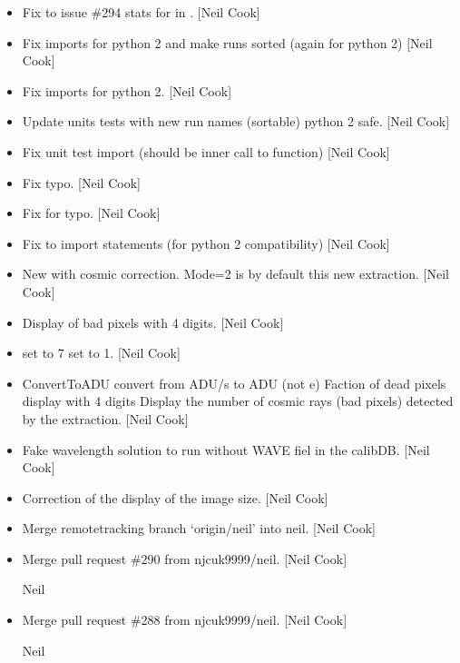 \documentclass[a4paper,10pt,english]{report}
\begin{document}
\begin{itemize}
\item {} 
Fix to issue \#294 \sphinxhyphen{} stats for  in .
{[}Neil Cook{]}

\item {} 
Fix imports for python 2 and make runs sorted (again for python 2)
{[}Neil Cook{]}

\item {} 
Fix imports for python 2. {[}Neil Cook{]}

\item {} 
Update units tests with new run names (sortable) \sphinxhyphen{} python 2 safe.
{[}Neil Cook{]}

\item {} 
Fix unit test import (should be inner call to function) {[}Neil Cook{]}

\item {} 
Fix typo. {[}Neil Cook{]}

\item {} 
Fix for typo. {[}Neil Cook{]}

\item {} 
Fix to import statements (for python 2 compatibility) {[}Neil Cook{]}

\item {} 
New  with cosmic correction. Mode=2 is by
default this new extraction. {[}Neil Cook{]}

\item {} 
Display of bad pixels with 4 digits. {[}Neil Cook{]}

\item {} 
 set to 7  set to \sphinxhyphen{}1. {[}Neil Cook{]}

\item {} 
ConvertToADU convert from ADU/s to ADU (not e\sphinxhyphen{}) Faction of dead pixels
display with 4 digits Display the number of cosmic rays (bad pixels)
detected by the extraction. {[}Neil Cook{]}

\item {} 
Fake wavelength solution to run without WAVE fiel in the calibDB.
{[}Neil Cook{]}

\item {} 
Correction of the display of the image size. {[}Neil Cook{]}

\item {} 
Merge remote\sphinxhyphen{}tracking branch ‘origin/neil’ into neil. {[}Neil Cook{]}

\item {} 
Merge pull request \#290 from njcuk9999/neil. {[}Neil Cook{]}

Neil

\item {} 
Merge pull request \#288 from njcuk9999/neil. {[}Neil Cook{]}

Neil

\end{itemize}
\end{document}

